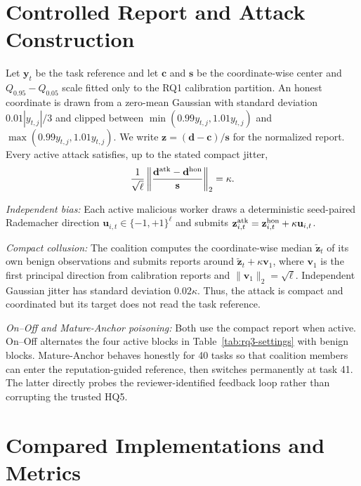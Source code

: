 \documentclass[journal]{IEEEtran}
\begin{document}
\section{Controlled Report and Attack Construction}
\label{app:rq3-attacks}

Let $\mathbf y_t$ be the task reference and let $\mathbf c$ and $\mathbf s$
be the coordinate-wise center and $Q_{0.95}-Q_{0.05}$ scale fitted only to the
RQ1 calibration partition. An honest coordinate is drawn from a zero-mean
Gaussian with standard deviation $0.01|y_{t,j}|/3$ and clipped between
$\min(0.99y_{t,j},1.01y_{t,j})$ and
$\max(0.99y_{t,j},1.01y_{t,j})$. We write
$\mathbf z=(\mathbf d-\mathbf c)/\mathbf s$ for the normalized report. Every
active attack satisfies, up to the stated compact jitter,
\begin{equation}
 \frac{1}{\sqrt{\ell}}
 \left\|\frac{\mathbf d^{\rm atk}-\mathbf d^{\rm hon}}{\mathbf s}\right\|_2
 =\kappa .
 \label{eq:rq3-strength}
\end{equation}

\textit{Independent bias:}
Each active malicious worker draws a deterministic seed-paired Rademacher
direction $\mathbf u_{i,t}\in\{-1,+1\}^{\ell}$ and submits
$\mathbf z^{\rm atk}_{i,t}=\mathbf z^{\rm hon}_{i,t}+\kappa\mathbf u_{i,t}$.

\textit{Compact collusion:}
The coalition computes the coordinate-wise median $\widetilde{\mathbf z}_t$ of
its own benign observations and submits reports around
$\widetilde{\mathbf z}_t+\kappa\mathbf v_1$, where $\mathbf v_1$ is the first
principal direction from calibration reports and
$\|\mathbf v_1\|_2=\sqrt{\ell}$. Independent Gaussian jitter has standard
deviation $0.02\kappa$. Thus, the attack is compact and coordinated but its
target does not read the task reference.

\textit{On--Off and Mature-Anchor poisoning:}
Both use the compact report when active. On--Off alternates the four active
blocks in Table~\ref{tab:rq3-settings} with benign blocks. Mature-Anchor behaves
honestly for 40 tasks so that coalition members can enter the reputation-guided
reference, then switches permanently at task 41. The latter directly probes the
reviewer-identified feedback loop rather than corrupting the trusted HQ5.

\section{Compared Implementations and Metrics}
\label{app:rq3-fairness}
\end{document}
